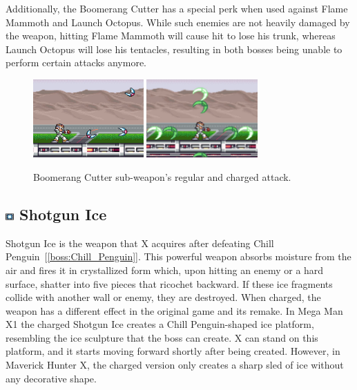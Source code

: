 Additionally, the Boomerang Cutter has a special perk when used against Flame Mammoth and Launch Octopus. While such enemies are not heavily damaged by the weapon, hitting Flame Mammoth will cause hit to lose his trunk, whereas Launch Octopus will lose his tentacles, resulting in both bosses being unable to perform certain attacks anymore.

\begin{figure}[htp]
	\centering
		\includegraphics[height=3cm]{figures/X1/weapons/Boomerang_1.jpg}
		\includegraphics[height=3cm]{figures/X1/weapons/Boomerang_2.jpg}
	\caption{Boomerang Cutter sub-weapon's regular and charged attack.}
\end{figure}

\subsection{\includegraphics[width=12px, height=10px]{figures/X1/weapons/S_ice.jpg} Shotgun Ice}\label{Shotgun_ice}

Shotgun Ice is the weapon that X acquires after defeating Chill Penguin~[\ref{boss:Chill_Penguin}]. This powerful weapon absorbs moisture from the air and fires it in crystallized form which, upon hitting an enemy or a hard surface, shatter into five pieces that ricochet backward. If these ice fragments collide with another wall or enemy, they are destroyed. When charged, the weapon has a different effect in the original game and its remake. In Mega Man X1 the charged Shotgun Ice creates a Chill Penguin-shaped ice platform, resembling the ice sculpture that the boss can create. X can stand on this platform, and it starts moving forward shortly after being created. However, in Maverick Hunter X, the charged version only creates a sharp sled of ice without any decorative shape.


